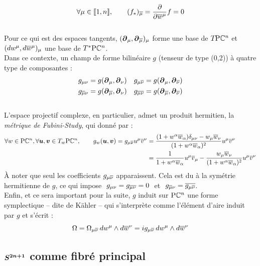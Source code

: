 \[\forall \mu\in\llbracket1,n\rrbracket,\qquad (f_*)_{\congu{\mu}} = \frac{\partial}{\partial \congu{w}^\mu}f = 0\] 
\\
Pour ce qui est des espaces tangents, $(\bt_\mu, \bt_{\congu{\mu}})_\mu$ forme une base de $\tg{\PC{n}}$ et $(dw^\mu, d\congu{w}^\mu)_\mu$ une base de $\tg{^* \PC{n}}$.
\\
Dans ce contexte, un champ de forme bilinéaire $g$ (tenseur de type (0,2)) à quatre type de composantes :
\begin{align*}
	g_{\mu \nu} &= g(\bt_{\mu}, \bt_{\nu})  &  g_{\mu \congu{\nu}} &= g(\bt_{\mu}, \bt_{\congu{\nu}}) \\
	g_{\congu{\mu} \nu} &= g(\bt_{\congu{\mu}}, \bt_{\nu})  &  g_{\congu{\mu} \congu{\nu}} &= g(\bt_{\congu{\mu}}, \bt_{\congu{\nu}})
\end{align*}
\\
L'espace projectif complexe, en particulier, admet un produit hermitien, la \emph{métrique de Fubini-Study}, qui donné par :
\begin{equation}
	\begin{aligned}
		\forall w\in\PC{n}, \forall \bf{u},\bf{v}\in\tg[w]{\PC{n}},\qquad g_w(\bf{u}, \bf{v}) = g_{\mu\congu{\nu}} u^\mu \congu{v}^\nu 
		&= \frac{(1+w^\alpha \congu{w}_\alpha)\delta_{\mu\nu} - w_\mu \congu{w}_\nu}{(1+w^\alpha \congu{w}_\alpha)^2}u^\mu \congu{v}^\nu \\
		&= \frac{1}{1+w^\alpha \congu{w}_\alpha} u^\mu \congu{v}_\mu - \frac{w_\mu \congu{w}_\nu}{(1+w^\alpha \congu{w}_\alpha)^2} u^\mu \congu{v}^\nu
	\end{aligned}
\end{equation}
À noter que seul les coefficients $g_{\mu \congu{\nu}}$ apparaissent. Cela est du à la symétrie hermitienne de $g$, ce qui impose $\ g_{\mu\nu} = g_{\congu{\mu\nu}} = 0\ $ et $\ g_{\congu{\mu} \nu} = \congu{g_{\mu \congu{\nu}}}$.
\\
Enfin, et ce sera important pour la suite, $g$ induit sur $\PC{n}$ une forme symplectique -- dite de Kähler -- qui s'interprète comme l'élément d'aire induit par $g$ et s'écrit :
\[\Omega = \Omega_{\mu\congu{\nu}}\, dw^\mu \wedge d\congu{w}^\nu 
	= ig_{\mu \congu{\nu}}\, dw^\mu \wedge d\congu{w}^\nu\]
\skipl





\subsection{$\bf{S^{2n+1}}$ comme fibré principal} \label{subsec:VFP}

